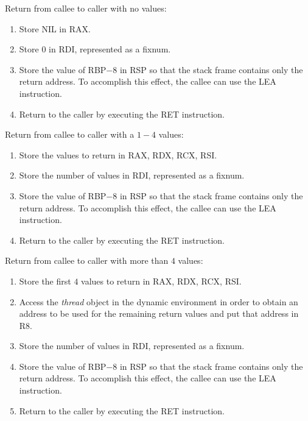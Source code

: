 Return from callee to caller with no values:

\begin{enumerate}
\item Store NIL in RAX.
\item Store $0$ in RDI, represented as a fixnum.
\item Store the value of RBP$ - 8$ in RSP so that the stack frame
  contains only the return address.  To accomplish this effect, the
  callee can use the LEA instruction.
\item Return to the caller by executing the RET instruction.
\end{enumerate}

Return from callee to caller with a $1 - 4$ values:

\begin{enumerate}
\item Store the values to return in RAX, RDX, RCX, RSI.
\item Store the number of values in RDI, represented as a fixnum.
\item Store the value of RBP$ - 8$ in RSP so that the stack frame
  contains only the return address.  To accomplish this effect, the
  callee can use the LEA instruction.
\item Return to the caller by executing the RET instruction.
\end{enumerate}

Return from callee to caller with more than $4$ values:

\begin{enumerate}
\item Store the first $4$ values to return in RAX, RDX, RCX, RSI.
\item Access the \emph{thread} object in the dynamic environment in
  order to obtain an address to be used for the remaining return
  values and put that address in R8.
\item Store the number of values in RDI, represented as a fixnum.
\item Store the value of RBP$ - 8$ in RSP so that the stack frame
  contains only the return address.  To accomplish this effect, the
  callee can use the LEA instruction.
\item Return to the caller by executing the RET instruction.
\end{enumerate}
